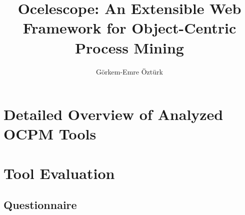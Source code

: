 \documentclass[bachelor]{padsthesis}
\begin{document}
\author{Görkem-Emre Öztürk}
\title{Ocelescope: An Extensible Web Framework for Object-Centric Process Mining}

\maketitle

\frontmatter



\tableofcontents
\listoffigures
\listoftables

\mainmatter



















\appendix

\chapter{Detailed Overview of Analyzed OCPM Tools}
\label{app:tools}


\chapter{Tool Evaluation}
\label{app:tool-evaluation}

\section{Questionnaire}
\label{app:tool-questionnaire}

\end{document}
